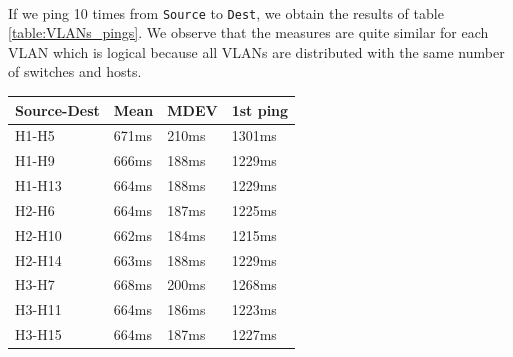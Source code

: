 \documentclass[a4paper, 11pt, oneside]{article}
\begin{document}
\paragraph{}If we ping 10 times from \texttt{Source} to \texttt{Dest}, we obtain the results of table \ref{table:VLANs_pings}. We observe that the measures are quite similar for each VLAN which is logical because all VLANs are distributed with the same number of switches and hosts. 
\begin{table}[H]
    \centering
    \begin{tabular}{|l|l|l|l|}
    \hline
    \multicolumn{1}{|c|}{\textbf{Source-Dest}} & \multicolumn{1}{c|}{\textbf{Mean}} & \multicolumn{1}{c|}{\textbf{MDEV}} & \multicolumn{1}{c|}{\textbf{1st ping}} \\ \hline
    H1-H5                                      & 671ms                              & 210ms                              & 1301ms                                 \\ \hline
    H1-H9                                      & 666ms                              & 188ms                              & 1229ms                                 \\ \hline
    H1-H13                                      & 664ms                              & 188ms                              & 1229ms                                 \\ \hline
    H2-H6                                      & 664ms                              & 187ms                              & 1225ms                                 \\ \hline
    H2-H10                                      & 662ms                              & 184ms                              & 1215ms                                 \\ \hline
    H2-H14                                     & 663ms                              & 188ms                              & 1229ms                                 \\ \hline
    H3-H7                                      & 668ms                              & 200ms                              & 1268ms                                 \\ \hline
    H3-H11                                      & 664ms                              & 186ms                              & 1223ms                                 \\ \hline
    H3-H15                                      & 664ms                              & 187ms                              & 1227ms                                 \\ \hline

\end{tabular}
\end{table}
\end{document}

